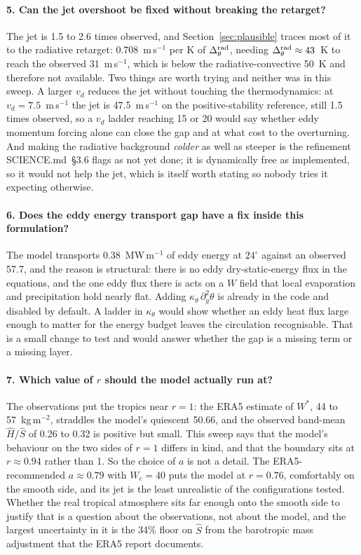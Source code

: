 \documentclass[11pt]{article}
\newcommand{\Hhat}{\hat{H}}
\newcommand{\Shat}{\hat{S}}
\newcommand{\Wstar}{W^{*}}
\newcommand{\py}{\partial_y}
\newcommand{\dyr}{\Delta_\theta^{\rm rad}}
\newcommand{\ms}{m\,s$^{-1}$}
\begin{document}
\paragraph{5. Can the jet overshoot be fixed without breaking the retarget?} The
jet is 1.5 to 2.6 times observed, and Section~\ref{sec:plausible} traces most of
it to the radiative retarget: 0.708~\ms{} per K of $\dyr$, needing
$\dyr \approx 43$~K to reach the observed 31~\ms, which is below the
radiative-convective 50~K and therefore not available. Two things are worth
trying and neither was in this sweep. A larger $v_d$ reduces the jet without
touching the thermodynamics: at $v_d = 7.5$~\ms{} the jet is 47.5~\ms{} on the
positive-stability reference, still 1.5 times observed, so a $v_d$ ladder reaching
15 or 20 would say whether eddy momentum forcing alone can close the gap and at
what cost to the overturning. And making the radiative background \emph{colder}
as well as steeper is the refinement SCIENCE.md~\S3.6 flags as not yet done; it is
dynamically free as implemented, so it would not help the jet, which is itself
worth stating so nobody tries it expecting otherwise.

\paragraph{6. Does the eddy energy transport gap have a fix inside this
formulation?} The model transports 0.38~MW\,m$^{-1}$ of eddy energy at
$24^\circ$ against an observed 57.7, and the reason is structural: there is no
eddy dry-static-energy flux in the equations, and the one eddy flux there is acts
on a $W$ field that local evaporation and precipitation hold nearly flat. Adding
$\kappa_\theta\,\py^2\theta$ is already in the code and disabled by default. A
ladder in $\kappa_\theta$ would show whether an eddy heat flux large enough to
matter for the energy budget leaves the circulation recognisable. That is a small
change to test and would answer whether the gap is a missing term or a missing
layer.

\paragraph{7. Which value of $r$ should the model actually run at?} The
observations put the tropics near $r = 1$: the ERA5 estimate of $\Wstar$, 44 to
57~kg\,m$^{-2}$, straddles the model's quiescent 50.66, and the observed
band-mean $\Hhat/\Shat$ of 0.26 to 0.32 is positive but small. This sweep says
that the model's behaviour on the two sides of $r = 1$ differs in kind, and that
the boundary sits at $r \approx 0.94$ rather than 1. So the choice of $a$ is not
a detail. The ERA5-recommended $a \approx 0.79$ with $W_c = 40$ puts the model at
$r = 0.76$, comfortably on the smooth side, and its jet is the least unrealistic
of the configurations tested. Whether the real tropical atmosphere sits far
enough onto the smooth side to justify that is a question about the observations,
not about the model, and the largest uncertainty in it is the 34\% floor on
$\Shat$ from the barotropic mass adjustment that the ERA5 report documents.
\end{document}
